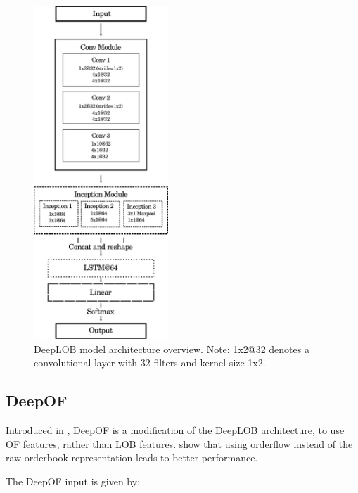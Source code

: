 \documentclass[a4paper, oneside, notitlepage]{book}
\begin{document}
\begin{multicols}{2}
\columnbreak
\begin{figure}[H]
    \centering
    \includegraphics[width=0.45\textwidth]{./images/deepLOB_architecture_long.pdf}
    \caption{DeepLOB model architecture overview. Note: 1x2@32 denotes a convolutional layer with 32 filters and kernel size 1x2.}
    \label{fig:DeepLOB}
\end{figure}
\end{multicols}

\subsection{DeepOF}
Introduced in \cite{KOLM2023}, DeepOF is a modification of the DeepLOB architecture, to use
OF features, rather than LOB features. \cite{KOLM2023} show that using orderflow
instead of the raw orderbook representation leads to better performance.

The DeepOF input is given by:
\end{document}
